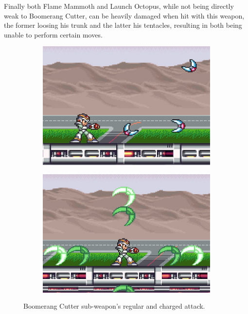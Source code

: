 Finally both Flame Mammoth and Launch Octopus, while not being directly weak to Boomerang Cutter, can be heavily damaged when hit with this weapon, the former loosing his trunk and the latter his tentacles, resulting in both being unable to perform certain moves.
\begin{figure}[htp]
	\centering
	\begin{subfigure}{0.3\linewidth}
		\includegraphics[width=\linewidth]{figures/X1/weapons/Boomerang_1.jpg}
	\end{subfigure}
	\begin{subfigure}{0.3\linewidth}
		\includegraphics[width=\linewidth]{figures/X1/weapons/Boomerang_2.jpg}
	\end{subfigure}
	\caption{Boomerang Cutter sub-weapon's regular and charged attack.}
\end{figure}

